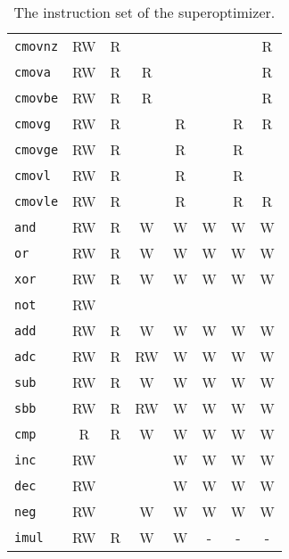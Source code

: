 \documentclass[a4paper,11pt]{kth-mag}
\begin{document}
\begin{table}
\begin{tabular}{l|cc|ccccc}
\verb|cmovnz| & RW & R  &           &           &           &           & R         \\
\verb|cmova|  & RW & R  & R         &           &           &           & R         \\
\verb|cmovbe| & RW & R  & R         &           &           &           & R         \\
\verb|cmovg|  & RW & R  &           & R         &           & R         & R         \\
\verb|cmovge| & RW & R  &           & R         &           & R         &           \\
\verb|cmovl|  & RW & R  &           & R         &           & R         &           \\
\verb|cmovle| & RW & R  &           & R         &           & R         & R         \\
\hline
\verb|and|    & RW & R  & W         & W         & W         & W         & W         \\
\verb|or|     & RW & R  & W         & W         & W         & W         & W         \\
\verb|xor|    & RW & R  & W         & W         & W         & W         & W         \\
\verb|not|    & RW &    &           &           &           &           &           \\
\hline
\verb|add|    & RW & R  & W         & W         & W         & W         & W         \\
\verb|adc|    & RW & R  & RW        & W         & W         & W         & W         \\
\verb|sub|    & RW & R  & W         & W         & W         & W         & W         \\
\verb|sbb|    & RW & R  & RW        & W         & W         & W         & W         \\
\verb|cmp|    & R  & R  & W         & W         & W         & W         & W         \\
\verb|inc|    & RW &    &           & W         & W         & W         & W         \\
\verb|dec|    & RW &    &           & W         & W         & W         & W         \\
\verb|neg|    & RW &    & W         & W         & W         & W         & W         \\
\hline
\verb|imul|   & RW & R  & W         & W         & -         & -         & -         \\
\end{tabular}
\caption{The instruction set of the superoptimizer.} %
\label{tab:insns}
\end{table}
\end{document}
